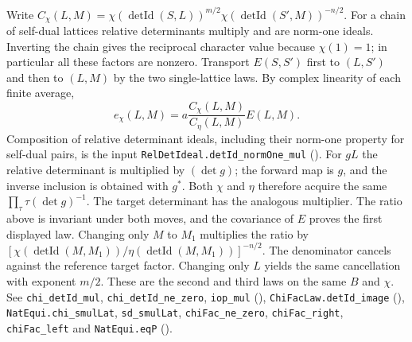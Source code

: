 Write $C_\chi(L,M)=\chi(\operatorname{detId}(S,L))^{m/2}\chi(\operatorname{detId}(S',M))^{-n/2}$.
For a chain of self-dual lattices relative determinants multiply and are
norm-one ideals. Inverting the chain gives the reciprocal character value
because $\chi(1)=1$; in particular all these factors are nonzero. Transport
$E(S,S')$ first to $(L,S')$ and then to $(L,M)$ by the two single-lattice
laws. By complex linearity of each finite average,
\[
 e_\chi(L,M)=a\frac{C_\chi(L,M)}{C_\eta(L,M)}E(L,M).
\]
Composition of relative determinant ideals, including their norm-one
property for self-dual pairs, is the input \nolinkurl{RelDetIdeal.detId_normOne_mul}
(). For $gL$ the relative determinant is multiplied by $(\det g)$; the forward
map is $g$, and the inverse inclusion is obtained with $g^*$.
Both $\chi$ and $\eta$ therefore acquire the same
$\prod_\tau\tau(\det g)^{-1}$. The target determinant has the
analogous multiplier. The ratio above is invariant under both moves,
and the covariance of $E$ proves the first displayed law. Changing
only $M$ to $M_1$ multiplies the ratio by
$[\chi(\operatorname{detId}(M,M_1))/\eta(\operatorname{detId}(M,M_1))]^{-n/2}$.
The denominator cancels against the reference target factor. Changing only
$L$ yields the same cancellation with exponent $m/2$. These are the
second and third laws on the same $B$ and $\chi$. See
\nolinkurl{chi_detId_mul}, \nolinkurl{chi_detId_ne_zero}, \nolinkurl{iop_mul}
(),
\nolinkurl{ChiFacLaw.detId_image} (),
\nolinkurl{NatEqui.chi_smulLat}, \nolinkurl{sd_smulLat},
\nolinkurl{chiFac_ne_zero}, \nolinkurl{chiFac_right}, \nolinkurl{chiFac_left}
and \nolinkurl{NatEqui.eqP}
().

